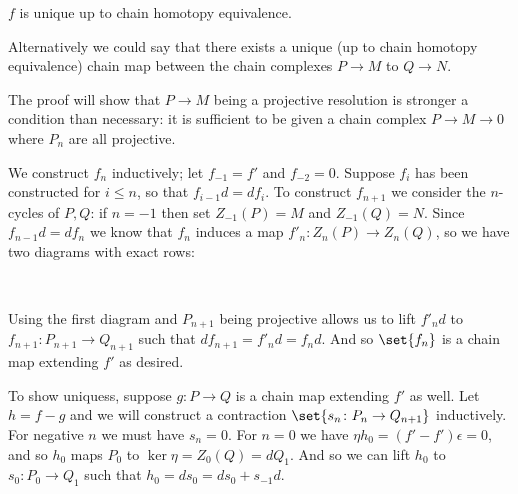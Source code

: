     $f$ is unique up to chain homotopy equivalence.

\ethrm

Alternatively we could say that there exists a unique (up to chain homotopy equivalence) chain map between the chain complexes $P\to M$ to $Q\to N$.

The proof will show that $P\to M$ being a projective resolution is stronger a condition than necessary: it is sufficient to be given a chain complex $P\to M\to0$
where $P_n$ are all projective.

\bproof

    We construct $f_n$ inductively; let $f_{-1}=f'$ and $f_{-2}=0$.
    Suppose $f_i$ has been constructed for $i\leq n$, so that $f_{i-1}d=df_i$.
    To construct $f_{n+1}$ we consider the $n$-cycles of $P,Q$: if $n=-1$ then set $Z_{-1}(P)=M$ and $Z_{-1}(Q)=N$.
    Since $f_{n-1}d=df_n$ we know that $f_n$ induces a map $f'_n\colon Z_n(P)\to Z_n(Q)$, so we have two diagrams with exact rows:

    \hbox{\hfill{}%
    \hfill{}\hfill}

    Using the first diagram and $P_{n+1}$ being projective allows us to lift $f'_nd$ to $f_{n+1}\colon P_{n+1}\to Q_{n+1}$ such that $df_{n+1}=f'_nd=f_nd$.
    And so $\set{f_n}$ is a chain map extending $f'$ as desired.

    To show uniquess, suppose $g\colon P\to Q$ is a chain map extending $f'$ as well.
    Let $h=f-g$ and we will construct a contraction $\set{s_n\colon P_n\to Q_{n+1}}$ inductively.
    For negative $n$ we must have $s_n=0$.
    For $n=0$ we have $\eta h_0=(f'-f')\epsilon=0$, and so $h_0$ maps $P_0$ to $\ker\eta=Z_0(Q)=dQ_1$.
    And so we can lift $h_0$ to $s_0\colon P_0\to Q_1$ such that $h_0=ds_0=ds_0+s_{-1}d$.

